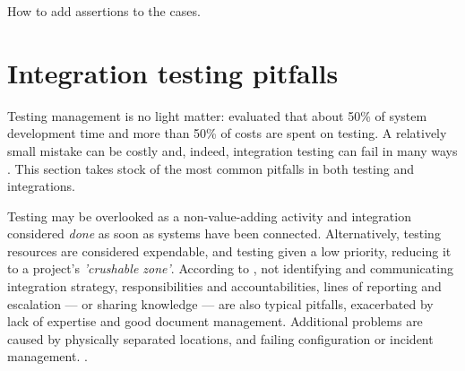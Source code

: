 \documentclass[12pt,a4paper,oneside,pdftex]{report}
\begin{document}
How to add assertions to the cases.

\section{Integration testing pitfalls}
\label{section:pitfalls}

Testing management is no light matter: \citet{reid2005art} evaluated that about 50\% of system development time and more than 50\% of costs are spent on testing. A relatively small mistake can be costly and, indeed, integration testing can fail in many ways \citep{van2008identifying}. This section takes stock of the most common pitfalls in both testing and integrations.

Testing may be overlooked as a non-value-adding activity and integration considered \emph{done} as soon as systems have been connected. Alternatively, testing resources are considered expendable, and testing given a low priority, reducing it to a project's \emph{'crushable zone'}. According to \citet{van2008identifying}, not identifying and communicating integration strategy, responsibilities and accountabilities, lines of reporting and escalation --- or sharing knowledge --- are also typical pitfalls, exacerbated by lack of expertise and good document management. Additional problems are caused by physically separated locations, and failing configuration or incident management. \citep{van2008identifying}.
\end{document}

